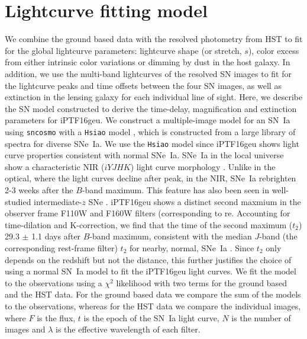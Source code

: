 \documentclass[a4paper,fleqn,usenatbib]{mnras}
\newcommand{\sn}{SN\xspace}
\begin{document}
\section{Lightcurve fitting model}
\label{sec:lcmodel}
We combine the ground based data with the resolved photometry from HST to fit for the global lightcurve parameters: lightcurve shape (or stretch, $s$), color excess from either intrinsic color variations or dimming by dust in the host galaxy. In addition, we use the multi-band lightcurves of the resolved 
\sn images to fit for the lightcurve peaks and time offsets between the four \sn images, as well as extinction in the lensing galaxy for each individual line of sight. 
Here, we describe the SN model constructed to derive the time-delay, magnification and extinction parameters for iPTF16geu. We construct a multiple-image model for an SN~Ia using \texttt{sncosmo} with a \texttt{Hsiao} model \citep{2007ApJ...663.1187H}, which is constructed from a large library of spectra for diverse SNe~Ia. We use the \texttt{Hsiao} model since iPTF16geu shows light curve properties consistent with normal SNe~Ia. 
SNe~Ia in the local universe show a characteristic NIR ($iYJHK$) light curve morphology \citep{1996AJ....112.2438H,2010AJ....139..120F}.  Unlike in the optical, where the light curves decline after peak, in the NIR, SNe~Ia rebrighten 2-3 weeks after the $B$-band maximum. This feature has also been seen in well-studied intermediate-$z$ SNe \citep[e.g., see][]{2000ApJ...536...62R}. iPTF16geu shows a distinct second maxmium in the observer frame F110W and F160W filters (corresponding to re. Accounting for time-dilation and K-correction, we find that the time of the second maximum ($t_2$)  29.3 $\pm$ 1.1 days after $B$-band maximum, consistent with the median $J$-band (the corresponding rest-frame filter) $t_2$ for nearby, normal, SNe~Ia \citep{2012A&A...537A..57B, 2015MNRAS.448.1345D}. Since $t_2$ only depends on the redshift but not the distance, this further justifies the choice of using a normal SN~Ia model to fit the iPTF16geu light curves. 
We fit the model to the observations using a $\chi^2$ likelihood with two terms for the ground based and the HST data. For the ground based data we compare the sum of the models to the observations, whereas for the HST data we compare the individual images, where $F$ is the flux, $t$ is the epoch of the SN~Ia light curve, $N$ is the number of images and $\lambda$ is the effective wavelength of each filter. 
\end{document}
